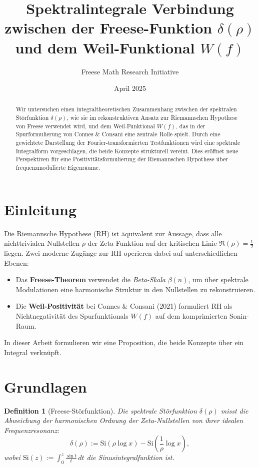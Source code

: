 \documentclass[11pt]{article}
\title{\textbf{Spektralintegrale Verbindung zwischen der Freese-Funktion \(\delta(\rho)\)\\ und dem Weil-Funktional \(W(f)\)}}
\author{Freese Math Research Initiative}
\date{April 2025}
\newtheorem{definition}{Definition}
\begin{document}
\maketitle

\begin{abstract}
Wir untersuchen einen integraltheoretischen Zusammenhang zwischen der spektralen Störfunktion \(\delta(\rho)\), wie sie im rekonstruktiven Ansatz zur Riemannschen Hypothese von Freese verwendet wird, und dem Weil-Funktional \(W(f)\), das in der Spurformulierung von Connes \& Consani eine zentrale Rolle spielt. Durch eine gewichtete Darstellung der Fourier-transformierten Testfunktionen wird eine spektrale Integralform vorgeschlagen, die beide Konzepte strukturell vereint. Dies eröffnet neue Perspektiven für eine Positivitätsformulierung der Riemannschen Hypothese über frequenzmodulierte Eigenräume.
\end{abstract}

\section{Einleitung}

Die Riemannsche Hypothese (RH) ist äquivalent zur Aussage, dass alle nichttrivialen Nullstellen \(\rho\) der Zeta-Funktion auf der kritischen Linie \(\Re(\rho) = \tfrac{1}{2}\) liegen. Zwei moderne Zugänge zur RH operieren dabei auf unterschiedlichen Ebenen:

\begin{itemize}[topsep=3pt]
    \item Das \textbf{Freese-Theorem} verwendet die \textit{Beta-Skala} \(\beta(n)\), um über spektrale Modulationen eine harmonische Struktur in den Nullstellen zu rekonstruieren.
    \item Die \textbf{Weil-Positivität} bei Connes \& Consani (2021) formuliert RH als Nichtnegativität des Spurfunktionals \(W(f)\) auf dem komprimierten Sonin-Raum.
\end{itemize}

In dieser Arbeit formulieren wir eine Proposition, die beide Konzepte über ein Integral verknüpft.

\section{Grundlagen}

\begin{definition}[Freese-Störfunktion]
Die spektrale Störfunktion \(\delta(\rho)\) misst die Abweichung der harmonischen Ordnung der Zeta-Nullstellen von ihrer idealen Frequenzresonanz:
\[
\delta(\rho) := \mathrm{Si}(\rho \log x) - \mathrm{Si}\left(\frac{1}{\rho} \log x\right),
\]
wobei \(\mathrm{Si}(z) := \int_0^z \frac{\sin t}{t} \, dt\) die Sinusintegralfunktion ist.
\end{definition}
\end{document}
